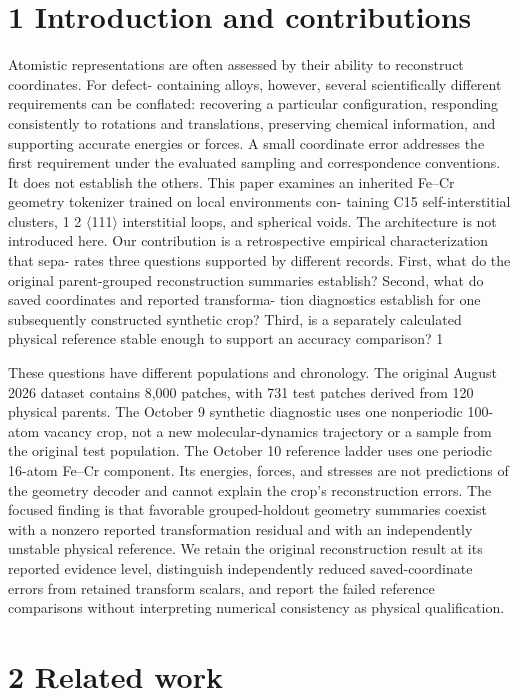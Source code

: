 \documentclass[11pt]{article}
\begin{document}
\section*{1 Introduction and contributions}

Atomistic representations are often assessed by their ability to reconstruct coordinates. For defect-
containing alloys, however, several scientifically different requirements can be conflated: recovering a
particular configuration, responding consistently to rotations and translations, preserving chemical
information, and supporting accurate energies or forces. A small coordinate error addresses the first
requirement under the evaluated sampling and correspondence conventions. It does not establish
the others.
This paper examines an inherited Fe–Cr geometry tokenizer trained on local environments con-
taining C15 self-interstitial clusters, 1
2 \ensuremath{\langle}111\ensuremath{\rangle} interstitial loops, and spherical voids. The architecture
is not introduced here. Our contribution is a retrospective empirical characterization that sepa-
rates three questions supported by different records. First, what do the original parent-grouped
reconstruction summaries establish? Second, what do saved coordinates and reported transforma-
tion diagnostics establish for one subsequently constructed synthetic crop? Third, is a separately
calculated physical reference stable enough to support an accuracy comparison?
1

These questions have different populations and chronology. The original August 2026 dataset
contains 8,000 patches, with 731 test patches derived from 120 physical parents. The October 9
synthetic diagnostic uses one nonperiodic 100-atom vacancy crop, not a new molecular-dynamics
trajectory or a sample from the original test population. The October 10 reference ladder uses
one periodic 16-atom Fe–Cr component. Its energies, forces, and stresses are not predictions of the
geometry decoder and cannot explain the crop’s reconstruction errors.
The focused finding is that favorable grouped-holdout geometry summaries coexist with a nonzero
reported transformation residual and with an independently unstable physical reference. We retain
the original reconstruction result at its reported evidence level, distinguish independently reduced
saved-coordinate errors from retained transform scalars, and report the failed reference comparisons
without interpreting numerical consistency as physical qualification.

\section*{2 Related work}
\end{document}
